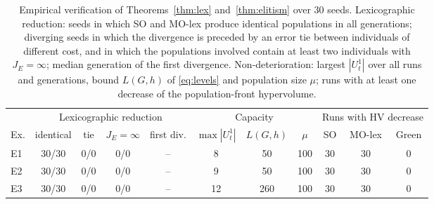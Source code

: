 \begin{table}[t]
\centering
\caption{Empirical verification of Theorems~\ref{thm:lex} and~\ref{thm:elitism} over 30 seeds. Lexicographic reduction: seeds in which SO and MO-lex produce identical populations in all generations; diverging seeds in which the divergence is preceded by an error tie between individuals of different cost, and in which the populations involved contain at least two individuals with $J_E=\infty$; median generation of the first divergence. Non-deterioration: largest $|U_t^1|$ over all runs and generations, bound $L(G,h)$ of \eqref{eq:levels} and population size $\mu$; runs with at least one decrease of the population-front hypervolume.}
\label{tab:checks_K}
\small
\setlength{\tabcolsep}{4pt}
\begin{tabular}{lcccccccccc}
\toprule
 & \multicolumn{4}{c}{Lexicographic reduction} & \multicolumn{3}{c}{Capacity} & \multicolumn{3}{c}{Runs with HV decrease} \\
\cmidrule(lr){2-5}\cmidrule(lr){6-8}\cmidrule(lr){9-11}
Ex. & identical & tie & $J_E{=}\infty$ & first div. & $\max|U_t^1|$ & $L(G,h)$ & $\mu$ & SO & MO-lex & Green \\
\midrule
E1 & 30/30 & 0/0 & 0/0 & -- & 8 & 50 & 100 & 30 & 30 & 0 \\
E2 & 30/30 & 0/0 & 0/0 & -- & 9 & 50 & 100 & 30 & 30 & 0 \\
E3 & 30/30 & 0/0 & 0/0 & -- & 12 & 260 & 100 & 30 & 30 & 0 \\
\bottomrule
\end{tabular}
\end{table}
